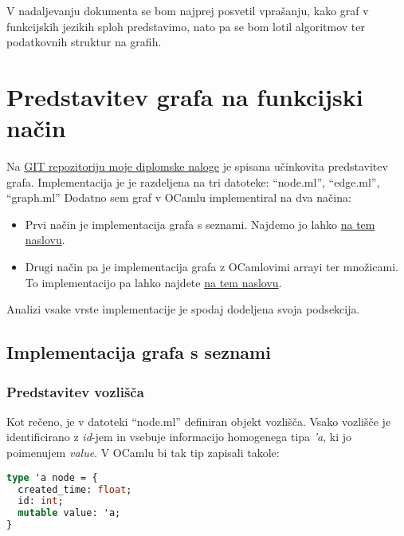 \documentclass[mat1, tisk]{fmfdelo}
\begin{document}
V nadaljevanju dokumenta se bom najprej posvetil vprašanju, kako graf v funkcijskih jezikih sploh predstavimo, nato pa se bom lotil algoritmov ter podatkovnih struktur na grafih.

\section{Predstavitev grafa na funkcijski način}

Na \href{https://github.com/tjazerzen/parallelisation-of-graph-algorithms-in-functional-programming-languages}{GIT repozitoriju moje diplomske naloge}
je spisana učinkovita predstavitev grafa. Implementacija je je razdeljena na tri datoteke: ``node.ml'', ``edge.ml'', ``graph.ml''
Dodatno sem graf v OCamlu implementiral na dva načina: 
\begin{itemize}
  \item Prvi način je implementacija grafa s seznami. 
  Najdemo jo lahko \href{https://github.com/tjazerzen/parallelisation-of-graph-algorithms-in-functional-programming-languages/tree/predstavitev_grafa_s_seznami/playground/graph}{na tem naslovu}.
  \item Drugi način pa je implementacija grafa z OCamlovimi arrayi ter množicami.
  To implementacijo pa lahko najdete \href{https://github.com/tjazerzen/parallelisation-of-graph-algorithms-in-functional-programming-languages/tree/predstavitev_grafa_z_arrayi_ter_mnozicami/playground/graph}{na tem naslovu}.
\end{itemize}

Analizi vsake vrste implementacije je spodaj dodeljena svoja podsekcija.

\subsection{Implementacija grafa s seznami}
\label{sec:implementacija_grafa_s_seznami}

\subsubsection{Predstavitev vozlišča}

Kot rečeno, je v datoteki ``node.ml'' definiran objekt vozlišča. Vsako vozlišče je identificirano z \textit{id}-jem in vsebuje informacijo homogenega tipa \textit{'a},
ki jo poimenujem \textit{value}. V OCamlu bi tak tip zapisali takole:

\begin{lstlisting}[language=Caml, caption={Definicija vozlišča v OCamlu}, label={lst:node_ocaml_type}]
type 'a node = {
  created_time: float;
  id: int;
  mutable value: 'a;
}
\end{lstlisting}
\end{document}

